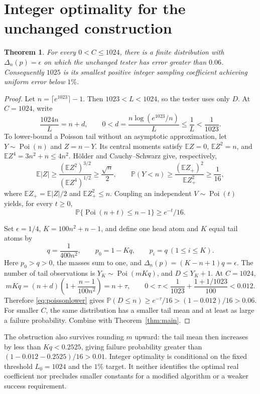 \documentclass[10pt]{article}
\newtheorem{theorem}{Theorem}
\newcommand{\E}{\mathbb E}
\newcommand{\Prob}{\mathbb P}
\newcommand{\Poi}{\operatorname{Poi}}
\begin{document}
\section{Integer optimality for the unchanged construction}
\begin{theorem}\label{thm:integer}
For every $0<C\le1024$, there is a finite distribution with
$\Delta_n(p)=\epsilon$ on which the unchanged tester has error greater
than $0.06$. Consequently $1025$ is its smallest positive integer sampling
coefficient achieving uniform error below $1\%$.
\end{theorem}
\begin{proof}
Let $n=\lceil e^{1023}\rceil-1$. Then $1023<L<1024$, so the tester uses
only $D$. At $C=1024$, write
\begin{equation}
 \frac{1024n}{L}=n+d,\qquad
 0<d=\frac{n\log(e^{1023}/n)}{L}\le\frac1L<\frac1{1023}.
 \label{eq:excess}
\end{equation}
To lower-bound a Poisson tail without an asymptotic approximation, let
$Y\sim\Poi(n)$ and $Z=n-Y$. Its central moments satisfy
$\E Z=0$, $\E Z^2=n$, and $\E Z^4=3n^2+n\le4n^2$.
H\"older and Cauchy--Schwarz give, respectively,
\[
 \E|Z|\ge\frac{(\E Z^2)^{3/2}}{(\E Z^4)^{1/2}}\ge\frac{\sqrt n}{2},
 \qquad
 \Prob(Y<n)\ge\frac{(\E Z_+)^2}{\E Z_+^2}\ge\frac1{16},
\]
where $\E Z_+=\E|Z|/2$ and $\E Z_+^2\le n$. Coupling an independent
$V\sim\Poi(t)$ yields, for every $t\ge0$,
\begin{equation}
 \Prob\{\Poi(n+t)\le n-1\}\ge e^{-t}/16.
 \label{eq:poissonlower}
\end{equation}

Set $\epsilon=1/4$, $K=100n^2+n-1$, and define one head atom and $K$
equal tail atoms by
\[
 q=\frac1{400n^2},\qquad p_0=1-Kq,\qquad p_i=q\ (1\le i\le K).
\]
Here $p_0>q>0$, the masses sum to one, and
$\Delta_n(p)=(K-n+1)q=\epsilon$. The number of tail observations is
$Y_K\sim\Poi(mKq)$, and $D\le Y_K+1$. At $C=1024$,
\[
 mKq=(n+d)\left(1+\frac{n-1}{100n^2}\right)=n+\tau,\qquad
 0<\tau<\frac1{1023}+\frac{1+1/1023}{100}<0.012.
\]
Therefore \eqref{eq:poissonlower} gives
$\Prob(D\le n)\ge e^{-\tau}/16>(1-0.012)/16>0.06$.
For smaller $C$, the same distribution has a smaller tail mean and at
least as large a failure probability. Combine with Theorem~\ref{thm:main}.
\end{proof}

The obstruction also survives rounding $m$ upward: the tail mean then
increases by less than $Kq<0.2525$, giving failure probability greater
than $(1-0.012-0.2525)/16>0.01$. Integer optimality is conditional on the
fixed threshold $L_0=1024$ and the $1\%$ target. It neither identifies the
optimal real coefficient nor precludes smaller constants for a modified
algorithm or a weaker success requirement.
\end{document}
